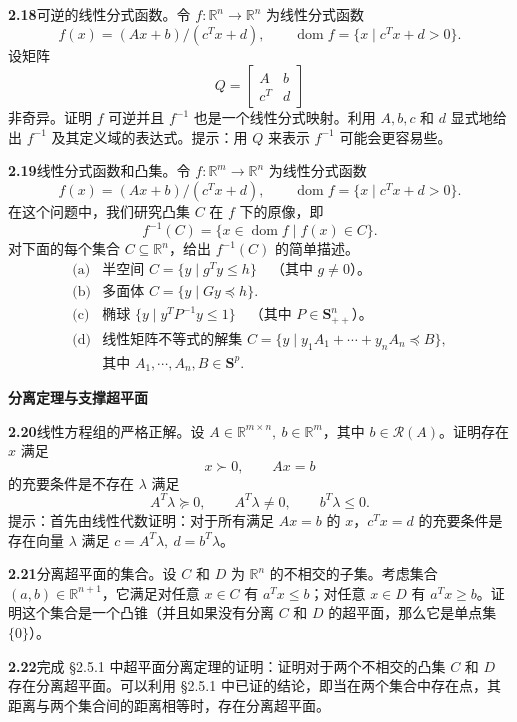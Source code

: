 \documentclass[UTF8,12pt,a4paper,fontset=fandol]{ctexart}
\begin{document}
\noindent\textbf{2.18}\quad 可逆的线性分式函数。令 $f:\mathbb{R}^n\to\mathbb{R}^n$ 为线性分式函数
\[
  f(x)=(Ax+b)/(c^Tx+d),\qquad \operatorname{dom}f=\{x\mid c^Tx+d>0\}.
\]
设矩阵
\[
  Q=\begin{bmatrix} A & b\\ c^T & d \end{bmatrix}
\]
非奇异。证明 $f$ 可逆并且 $f^{-1}$ 也是一个线性分式映射。利用 $A,b,c$ 和 $d$ 显式地给出 $f^{-1}$ 及其定义域的表达式。提示：用 $Q$ 来表示 $f^{-1}$ 可能会更容易些。

\noindent\textbf{2.19}\quad 线性分式函数和凸集。令 $f:\mathbb{R}^m\to\mathbb{R}^n$ 为线性分式函数
\[
  f(x)=(Ax+b)/(c^Tx+d),\qquad \operatorname{dom}f=\{x\mid c^Tx+d>0\}.
\]
在这个问题中，我们研究凸集 $C$ 在 $f$ 下的原像，即
\[
  f^{-1}(C)=\{x\in\operatorname{dom}f\mid f(x)\in C\}.
\]
对下面的每个集合 $C\subseteq\mathbb{R}^n$，给出 $f^{-1}(C)$ 的简单描述。
\[
  \begin{array}{ll}
  \text{(a)} & \text{半空间 }C=\{y\mid g^Ty\le h\}\quad \text{（其中 }g\ne0\text{）。}\\
  \text{(b)} & \text{多面体 }C=\{y\mid Gy\preceq h\}.\\
  \text{(c)} & \text{椭球 }\{y\mid y^TP^{-1}y\le1\}\quad \text{（其中 }P\in\mathbf{S}_{++}^n\text{）。}\\
  \text{(d)} & \text{线性矩阵不等式的解集 }C=\{y\mid y_1A_1+\cdots+y_nA_n\preceq B\},\\
  & \text{其中 }A_1,\cdots,A_n,B\in\mathbf{S}^p.
  \end{array}
\]

\noindent\textbf{分离定理与支撑超平面}

\noindent\textbf{2.20}\quad 线性方程组的严格正解。设 $A\in\mathbb{R}^{m\times n},\ b\in\mathbb{R}^m$，其中 $b\in\mathcal{R}(A)$。证明存在 $x$ 满足
\[
  x\succ0,\qquad Ax=b
\]
的充要条件是不存在 $\lambda$ 满足
\[
  A^T\lambda\succeq0,\qquad A^T\lambda\ne0,\qquad b^T\lambda\le0.
\]
提示：首先由线性代数证明：对于所有满足 $Ax=b$ 的 $x$，$c^Tx=d$ 的充要条件是存在向量 $\lambda$ 满足 $c=A^T\lambda,\ d=b^T\lambda$。

\noindent\textbf{2.21}\quad 分离超平面的集合。设 $C$ 和 $D$ 为 $\mathbb{R}^n$ 的不相交的子集。考虑集合 $(a,b)\in\mathbb{R}^{n+1}$，它满足对任意 $x\in C$ 有 $a^Tx\le b$；对任意 $x\in D$ 有 $a^Tx\ge b$。证明这个集合是一个凸锥（并且如果没有分离 $C$ 和 $D$ 的超平面，那么它是单点集 $\{0\}$）。

\noindent\textbf{2.22}\quad 完成 \S2.5.1 中超平面分离定理的证明：证明对于两个不相交的凸集 $C$ 和 $D$ 存在分离超平面。可以利用 \S2.5.1 中已证的结论，即当在两个集合中存在点，其距离与两个集合间的距离相等时，存在分离超平面。
\end{document}
